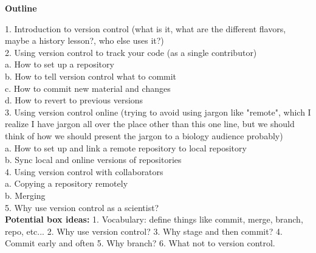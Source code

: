 \textbf{Outline}

1. Introduction to version control (what is it, what are the different flavors, maybe a history lesson?, who else uses it?)\\

2. Using version control to track your code (as a single contributor)\\
    a. How to set up a repository\\
    b. How to tell version control what to commit\\
    c. How to commit new material and changes\\
    d. How to revert to previous versions\\
    
3. Using version control online (trying to avoid using jargon like "remote", which I realize I have jargon all over the place other than this one line, but we should think of how we should present the jargon to a biology audience probably)\\
    a. How to set up and link a remote repository to local repository\\
    b. Sync local and online versions of repositories\\
    
4. Using version control with collaborators\\
    a. Copying a repository remotely\\
    b. Merging\\
    
5. Why use version control as a scientist?\\


\textbf{Potential box ideas:}
1. Vocabulary: define things like commit, merge, branch, repo, etc...
2. Why use version control?
3. Why stage and then commit?
4. Commit early and often
5. Why branch?
6. What not to version control.